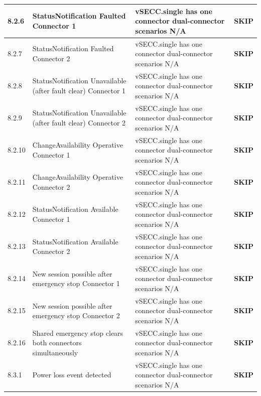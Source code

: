 \documentclass[10pt, a4paper]{article}
\begin{document}
\begin{longtable}{|L{1cm}|L{5.5cm}|M{7cm}|C{1.8cm}|}
\hline
\small 8.2.6 & \small StatusNotification Faulted  Connector 1 & vSECC.single has one connector  dual-connector scenarios N/A & \textcolor{skipgray}{\textbf{SKIP}} \\
\hline
\small 8.2.7 & \small StatusNotification Faulted  Connector 2 & vSECC.single has one connector  dual-connector scenarios N/A & \textcolor{skipgray}{\textbf{SKIP}} \\
\hline
\small 8.2.8 & \small StatusNotification Unavailable (after fault clear)  Connector 1 & vSECC.single has one connector  dual-connector scenarios N/A & \textcolor{skipgray}{\textbf{SKIP}} \\
\hline
\small 8.2.9 & \small StatusNotification Unavailable (after fault clear)  Connector 2 & vSECC.single has one connector  dual-connector scenarios N/A & \textcolor{skipgray}{\textbf{SKIP}} \\
\hline
\small 8.2.10 & \small ChangeAvailability Operative  Connector 1 & vSECC.single has one connector  dual-connector scenarios N/A & \textcolor{skipgray}{\textbf{SKIP}} \\
\hline
\small 8.2.11 & \small ChangeAvailability Operative  Connector 2 & vSECC.single has one connector  dual-connector scenarios N/A & \textcolor{skipgray}{\textbf{SKIP}} \\
\hline
\small 8.2.12 & \small StatusNotification Available  Connector 1 & vSECC.single has one connector  dual-connector scenarios N/A & \textcolor{skipgray}{\textbf{SKIP}} \\
\hline
\small 8.2.13 & \small StatusNotification Available  Connector 2 & vSECC.single has one connector  dual-connector scenarios N/A & \textcolor{skipgray}{\textbf{SKIP}} \\
\hline
\small 8.2.14 & \small New session possible after emergency stop  Connector 1 & vSECC.single has one connector  dual-connector scenarios N/A & \textcolor{skipgray}{\textbf{SKIP}} \\
\hline
\small 8.2.15 & \small New session possible after emergency stop  Connector 2 & vSECC.single has one connector  dual-connector scenarios N/A & \textcolor{skipgray}{\textbf{SKIP}} \\
\hline
\small 8.2.16 & \small Shared emergency stop clears both connectors simultaneously & vSECC.single has one connector  dual-connector scenarios N/A & \textcolor{skipgray}{\textbf{SKIP}} \\
\hline
\small 8.3.1 & \small Power loss event detected & vSECC.single has one connector  dual-connector scenarios N/A & \textcolor{skipgray}{\textbf{SKIP}} \\

\end{longtable}
\end{document}
